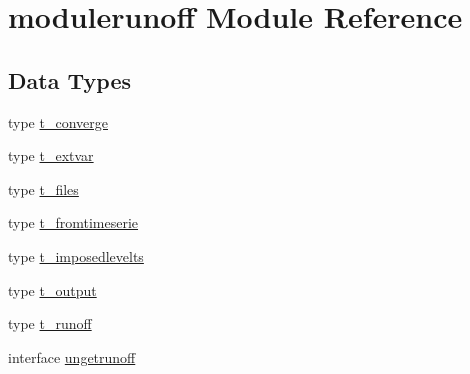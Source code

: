 \hypertarget{namespacemodulerunoff}{}\section{modulerunoff Module Reference}
\label{namespacemodulerunoff}
\subsection*{Data Types}
\begin{DoxyCompactItemize}
\item 
type \mbox{\hyperlink{structmodulerunoff_1_1t__converge}{t\+\_\+converge}}
\item 
type \mbox{\hyperlink{structmodulerunoff_1_1t__extvar}{t\+\_\+extvar}}
\item 
type \mbox{\hyperlink{structmodulerunoff_1_1t__files}{t\+\_\+files}}
\item 
type \mbox{\hyperlink{structmodulerunoff_1_1t__fromtimeserie}{t\+\_\+fromtimeserie}}
\item 
type \mbox{\hyperlink{structmodulerunoff_1_1t__imposedlevelts}{t\+\_\+imposedlevelts}}
\item 
type \mbox{\hyperlink{structmodulerunoff_1_1t__output}{t\+\_\+output}}
\item 
type \mbox{\hyperlink{structmodulerunoff_1_1t__runoff}{t\+\_\+runoff}}
\item 
interface \mbox{\hyperlink{interfacemodulerunoff_1_1ungetrunoff}{ungetrunoff}}
\end{DoxyCompactItemize}
